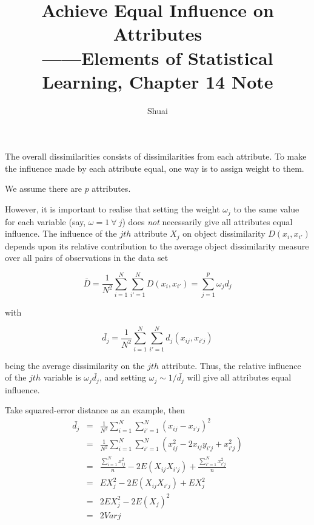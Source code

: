 \documentclass[a4paper]{article}
\title{Achieve Equal Influence on Attributes\\ \small ——Elements of
Statistical Learning, Chapter 14 Note}
\author{Shuai}
\begin{document}
\maketitle

The overall dissimilarities consists of dissimilarities from each attribute. To make
the influence made by each attribute equal, one way is to assign weight to them.

We assume there are $p$ attributes.

However, it is important to realise that setting the weight $\omega_j$ to the
same value for each variable (say, $\omega = 1\ \forall\ j$) does \textit{not}
necessarily give all attributes equal influence. The influence of the $jth$
attribute $X_j$ on object dissimilarity $D(x_i,x_{i'})$ depends upon its
relative contribution to the average object dissimilarity measure over all pairs
of observations in the data set

\begin{displaymath}
	\bar{D} = \frac{1}{N^2}\sum\limits^{N}_{i=1}\sum\limits^{N}_{i'=1}D(x_i,x_{i'}) = \sum\limits^{p}_{j=1}\omega_jd_j
\end{displaymath}

with

\begin{displaymath}
	\bar{d_j} = \frac{1}{N^2}\sum\limits^{N}_{i=1}\sum\limits^{N}_{i'=1}d_j(x_{ij},x_{i'j})
\end{displaymath}

being the average dissimilarity on the $jth$ attribute. Thus, the relative
influence of the $jth$ variable is $\omega_j\bar{d_j}$, and setting $\omega_j
\sim 1/\bar{d_j}$ will give all attributes equal influence.

Take squared-error distance as an example, then 
\begin{eqnarray}
	\bar{d_j} &=& \frac{1}{N^2}\sum\limits^{N}_{i=1}\sum\limits^{N}_{i'=1}(x_{ij} - x_{i'j})^2 \nonumber\\
						&=& \frac{1}{N^2}\sum\limits^{N}_{i=1}\sum\limits^{N}_{i'=1}(x_{ij}^2 - 2x_{ij}y_{i'j} + x_{i'j}^2) \nonumber\\
						&=& \frac{\sum\limits^{N}_{i=1}x_{ij}^2}{n} - 2E(X_{ij}X_{i'j}) + \frac{\sum\limits^{N}_{i'=1}x_{i'j}^2}{n} \nonumber\\
						&=& EX_{j}^2 - 2E(X_{ij}X_{i'j}) + EX_{j}^2 \nonumber\\
						&=& 2EX_{j}^2 - 2E(X_{j})^2 \nonumber\\
						&=& 2Varj \nonumber
\end{eqnarray}
\end{document}
